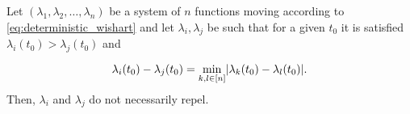 



\begin{proposition} \label{proposition:laguerre_does_not_grow}
    Let $(\lambda_1, \lambda_2, \dots, \lambda_n)$ be a system of $n$ functions moving according to \eqref{eq:deterministic_wishart} and let $\lambda_i,\lambda_j$ be such that for a given $t_0$ it is satisfied $\lambda_i(t_0) > \lambda_j(t_0)$ and 
    
    \begin{equation*}
        \lambda_i(t_0) - \lambda_j(t_0) = \min_{k,l \in [n]} \lvert  \lambda_k(t_0) - \lambda_l(t_0) \rvert.
    \end{equation*}
    Then, $\lambda_i$ and $\lambda_j$ do not necessarily repel. 
\end{proposition}

